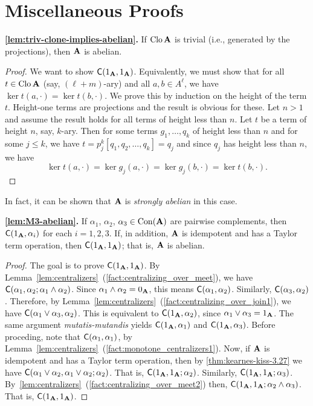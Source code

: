 \appendix
\acresetall

\section{Miscellaneous Proofs}
\label{sec:proofs-elem-facts}
\begin{lem} {\bf \ref{lem:triv-clone-implies-abelian}.}
If $\operatorname{Clo} \mathbf{A}$ is trivial (i.e., generated by the projections),
then $\mathbf{A}$ is abelian.
\end{lem}
\begin{proof}
We want to show $\mathsf{C}(1_{\mathbf{A}}, 1_{\mathbf{A}})$.  Equivalently, we must show
that for all $t\in \operatorname{Clo}\mathbf{A}$ (say, $(\ell+m)$-ary) 
and all $a, b \in A^\ell$, we have $\ker t(a,\cdot)=\ker t(b,\cdot)$.
We prove this by induction on the height of the term $t$.  Height-one terms are
projections and the result is obvious for these.  Let $n>1$ and assume the result
holds for all terms  of height less than
$n$.  Let $t$ be a term of height $n$, say, $k$-ary.  Then for some terms 
$g_1, \dots, q_k$ of height less than $n$ and for some $j\leq k$, we have
$t = p^k_j [q_1, q_2, \dots, q_k] = q_j$ and since $q_j$ has height less than
$n$, we have
\[
\ker t(a,\cdot)=\ker g_j(a,\cdot) = \ker g_j(b,\cdot)=\ker t(b,\cdot).
\]\end{proof}
In fact, it can be shown that $\mathbf{A}$ is \emph{strongly abelian} in this case. 

\begin{lem}{\bf \ref{lem:M3-abelian}.}
If $\alpha_1$, $\alpha_2$, $\alpha_3 \in \operatorname{Con}(\mathbf{A})$ are pairwise complements,
then $\mathsf{C}(1_{\mathbf{A}}, \alpha_i)$ for each $i=1,2,3$.  If, in addition, $\mathbf{A}$ is
idempotent and has a Taylor term operation, then $\mathsf{C}(1_{\mathbf{A}}, 1_{\mathbf{A}})$; that is, $\mathbf{A}$ is abelian.
\end{lem}
\begin{proof}
  The goal is to prove $\mathsf{C}(1_{\mathbf{A}}, 1_{\mathbf{A}})$.
  By Lemma~\ref{lem:centralizers}~(\ref{fact:centralizing_over_meet}), we have
  $\mathsf{C}(\alpha_1, \alpha_2; \alpha_1 \wedge \alpha_2)$.  
  Since $\alpha_1 \wedge \alpha_2= 0_{\mathbf{A}}$, this means
  $\mathsf{C}(\alpha_1, \alpha_2)$.
  Similarly, $\mathsf{C}(\alpha_3, \alpha_2)$.  Therefore, by 
  Lemma~\ref{lem:centralizers}~(\ref{fact:centralizing_over_join1}), we have
  $\mathsf{C}(\alpha_1 \vee \alpha_3, \alpha_2)$. This is equivalent to 
  $\mathsf{C}(1_{\mathbf{A}}, \alpha_2)$, since $\alpha_1 \vee \alpha_3 = 1_{\mathbf{A}}$. 
  The same argument \emph{mutatis-mutandis} yields
  $\mathsf{C}(1_{\mathbf{A}},\alpha_1)$ and $\mathsf{C}(1_{\mathbf{A}},\alpha_3)$. 
  Before proceding, note that $\mathsf{C}(\alpha_1, \alpha_1)$, by 
  Lemma~\ref{lem:centralizers}~(\ref{fact:monotone_centralizers1}).
  Now, if $\mathbf{A}$ is idempotent and has a Taylor term operation, then
  by \ref{thm:kearnes-kiss-3.27} we have 
  $\mathsf{C}(\alpha_1 \vee \alpha_2,\alpha_1 \vee \alpha_2; \alpha_2)$.
  That is, $\mathsf{C}(1_{\mathbf{A}},1_{\mathbf{A}}; \alpha_2)$.
  Similarly, $\mathsf{C}(1_{\mathbf{A}},1_{\mathbf{A}}; \alpha_3)$.
  By~\ref{lem:centralizers}~(\ref{fact:centralizing_over_meet2}) then, 
  $\mathsf{C}(1_{\mathbf{A}},1_{\mathbf{A}}; \alpha_2 \wedge\alpha_3)$. 
  That is, $\mathsf{C}(1_{\mathbf{A}},1_{\mathbf{A}})$.
\end{proof}

